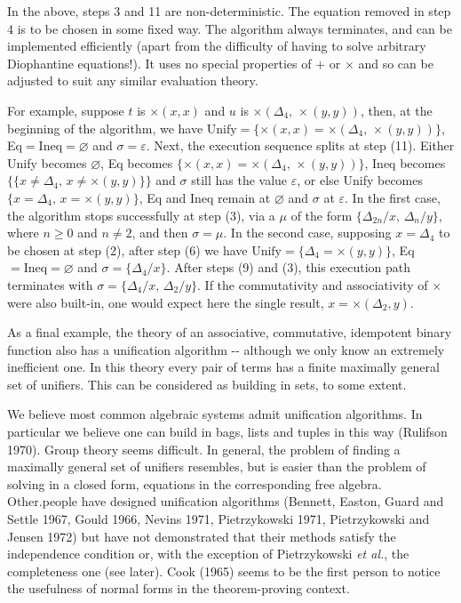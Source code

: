 \documentclass[letterpaper]{report}
\begin{document}
In the above, steps 3 and 11 are non-deterministic. The equation removed
in step 4 is to be chosen in some fixed way. The algorithm always
terminates, and can be implemented efficiently (apart from the
difficulty of having to solve arbitrary Diophantine equations!). It uses
no special properties of $+$ or $\times$ and so can be adjusted to
suit any similar evaluation theory.

For example, suppose $t$ is $\times(x,x)$ and $u$ is
$\times(\Delta_{4},\,\times(y,y))$, then, at the beginning of the
algorithm, we have
$\mbox{Unify} = \{\times(x,x) = \times(\Delta_{4},\,\times(y,y))\}$,
Eq$ = \mbox{Ineq} = \mbox{$\varnothing$}$ and
$\sigma = \varepsilon$. Next, the execution sequence splits at step
(11). Either Unify becomes $\varnothing$, Eq becomes
$\{\times(x,x) = \times(\Delta_{4},\,\times(y,y))\}$, Ineq becomes
$\{\{x \neq \Delta_{4},\,x \neq \times(y,y)\}\}$ and $\sigma$ still
has the value $\varepsilon$, or else Unify becomes
$\{x = \Delta_{4},\,x = \times(y,y)\}$, Eq and Ineq remain at
$\varnothing$ and $\sigma$ at $\varepsilon$. In the first case,
the algorithm stops successfully at step (3), via a $\mu$ of the form
$\{\Delta_{2n}/x,\,\Delta_{n}/y\}$, where $n \geqslant 0$ and
$n \neq 2$, and then $\sigma = \mu$. In the second case, supposing
$x = \Delta_{4}$ to be chosen at step (2), after step (6) we have
$\mbox{Unify} = \{\Delta_{4} = \times(y,y)\}$,
Eq$ = \mbox{Ineq} = \mbox{$\varnothing$}$ and
$\sigma = \{\Delta_{4}/x\}$. After steps (9) and (3), this execution
path terminates with $\sigma = \{\Delta_{4}/x,\,\Delta_{2}/y\}$. If
the commutativity and associativity of $\times$ were also built-in,
one would expect here the single result, $x = \times(\Delta_{2},y)$.

As a final example, the theory of an associative, commutative,
idempotent binary function also has a unification algorithm -\/-
although we only know an extremely inefficient one. In this theory every
pair of terms has a finite maximally general set of unifiers. This can
be considered as building in sets, to some extent.

We believe most common algebraic systems admit unification algorithms.
In particular we believe one can build in bags, lists and tuples in this
way (Rulifson 1970). Group theory seems difficult. In general, the
problem of finding a maximally general set of unifiers resembles, but is
easier than the problem of solving in a closed form, equations in the
corresponding free algebra. Other.people have designed unification
algorithms (Bennett, Easton, Guard and Settle 1967, Gould 1966, Nevins
1971, Pietrzykowski 1971, Pietrzykowski and Jensen 1972) but have not
demonstrated that their methods satisfy the independence condition or,
with the exception of Pietrzykowski \emph{et al.}, the completeness one
(see later). Cook (1965) seems to be the first person to notice the
usefulness of normal forms in the theorem-proving context.
\end{document}
